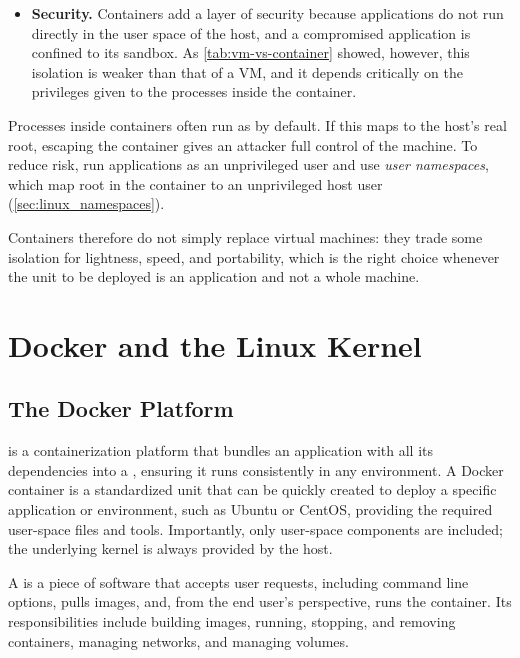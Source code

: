 \begin{itemize}
    \item \textbf{Security.} Containers add a layer of security because applications do not run directly in the user space of the host, and a compromised application is confined to its sandbox. As \cref{tab:vm-vs-container} showed, however, this isolation is weaker than that of a VM, and it depends critically on the privileges given to the processes inside the container.
\end{itemize}

\medskip

\begin{warningblock}
    Processes inside containers often run as  by default. If this maps to the host's real root, escaping the container gives an attacker full control of the machine. To reduce risk, run applications as an unprivileged user and use \emph{user namespaces}, which map root in the container to an unprivileged host user (\cref{sec:linux_namespaces}).
\end{warningblock}

\medskip

Containers therefore do not simply replace virtual machines: they trade some isolation for lightness, speed, and portability, which is the right choice whenever the unit to be deployed is an application and not a whole machine.

\section{Docker and the Linux Kernel} \label{sec:docker}

\subsection{The Docker Platform}

 is a containerization platform that bundles an application with all its dependencies into a , ensuring it runs consistently in any environment. A Docker container is a standardized unit that can be quickly created to deploy a specific application or environment, such as Ubuntu or CentOS, providing the required user-space files and tools. Importantly, only user-space components are included; the underlying kernel is always provided by the host.

\begin{definitionblock}
    A  is a piece of software that accepts user requests, including command line options, pulls images, and, from the end user's perspective, runs the container. Its responsibilities include building images, running, stopping, and removing containers, managing networks, and managing volumes.
\end{definitionblock}

